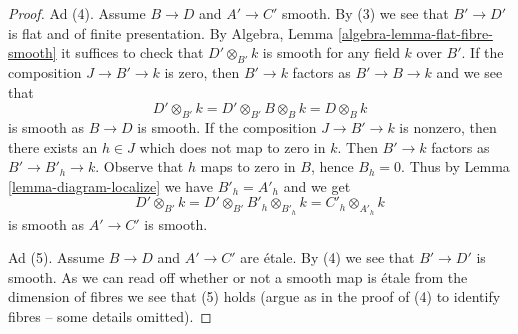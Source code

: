 \begin{proof}
\medskip\noindent
Ad (4). Assume $B \to D$ and $A' \to C'$ smooth.
By (3) we see that $B' \to D'$ is flat and of finite presentation.
By Algebra, Lemma \ref{algebra-lemma-flat-fibre-smooth}
it suffices to check that $D' \otimes_{B'} k$ is smooth for any
field $k$ over $B'$. If the composition $J \to B' \to k$ is zero,
then $B' \to k$ factors as $B' \to B \to k$ and we see that
$$
D' \otimes_{B'} k = D' \otimes_{B'} B \otimes_B k
= D \otimes_B k
$$
is smooth as $B \to D$ is smooth. If the composition $J \to B' \to k$
is nonzero, then there exists an $h \in J$ which does not map to zero
in $k$. Then $B' \to k$ factors as $B' \to B'_h \to k$.
Observe that $h$ maps to zero in $B$, hence $B_h = 0$.
Thus by Lemma \ref{lemma-diagram-localize} we have $B'_h = A'_h$ and we get
$$
D' \otimes_{B'} k = D' \otimes_{B'} B'_h \otimes_{B'_h} k
= C'_h \otimes_{A'_h} k
$$
is smooth as $A' \to C'$ is smooth.

\medskip\noindent
Ad (5). Assume $B \to D$ and $A' \to C'$ are \'etale. By (4) we see that
$B' \to D'$ is smooth. As we can read off whether or not a smooth
map is \'etale from the dimension of fibres we see that (5) holds
(argue as in the proof of (4) to identify fibres -- some details omitted).
\end{proof}

